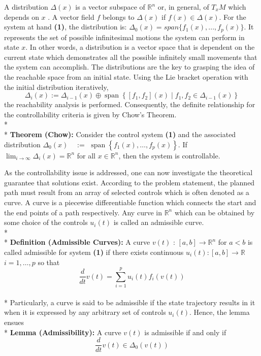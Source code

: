 \documentclass[letterpaper, 10 pt, conference]{ieeeconf}
\begin{document}
A distribution $\Delta(x)$ is a vector subspace of $\mathbb{R}^n$ or, in general, of $T_xM$ which depends on $x$ \cite{PAPER1}. A vector field $f$ belongs to $\Delta(x)$ if $f(x) \in \Delta(x)$. For the system at hand \textbf{(1)}, the distribution is: $\Delta_0(x) = span\{f_1(x),...,f_p(x)\}$. It represents the set of possible infinitesimal motions the system can perform in state $x$. In other words, a distribution is a vector space that is dependent on the current state which demonstrates all the possible infinitely small movements that the system can accomplish. The distributions are the key to grasping the idea of the reachable space from an initial state. Using the Lie bracket operation with the initial distribution iteratively,
\begin{equation}
\Delta_{i}(x):=\Delta_{i-1}(x) \oplus \operatorname{span}\left\{\left[f_{1}, f_{2}\right](x) \mid f_{1}, f_{2} \in \Delta_{i-1}(x)\right\} 
\end{equation}
the reachability analysis is performed. Consequently, the definite relationship for the controllability criteria is given by Chow’s Theorem.
\\*
\\*
\textbf{Theorem (Chow):} Consider the control system \textbf{(1)} and the associated distribution $\Delta_{0}(x) \quad:=$ $\operatorname{span}\left\{f_{1}(x), \ldots, f_{p}(x)\right\} .$ If $\lim _{i \rightarrow \infty} \Delta_{i}(x)=\mathbb{R}^n$ for all $x \in \mathbb{R}^n$, then the system is controllable.

As the controllability issue is addressed, one can now investigate the theoretical guarantee that solutions exist. According to the problem statement, the planned path must result from an array of selected controls which is often denoted as a curve. A curve is a piecewise differentiable function which connects the start and the end points of a path respectively. Any curve in $\mathbb{R}^n$ which can be obtained by some choice of the controls $u_i(t)$ is called an admissible curve. 
\\*
\\*
\textbf{Definition (Admissible Curves):} A curve $v(t)$ : $[a, b] \rightarrow \mathbb{R}^n$ for $a<b$ is called admissible for system \textbf{(1)} if there exists continuous $u_{i}(t):[a, b] \rightarrow \mathbb{R}$ $i=1, \ldots, p$ so that
\begin{equation}
\frac{d}{d t} v(t)=\sum_{i=1}^{p} u_{i}(t) f_{i}(v(t))
\end{equation}
\\*
Particularly, a curve is said to be admissible if the state trajectory results in it when it is expressed by any arbitrary set of controls $u_i(t)$. Hence, the lemma ensues
\\*
\textbf{Lemma (Admissibility):} A curve $v(t)$ is admissible if and only if 
\begin{equation}
\frac{d}{d t} v(t) \in \Delta_{0}(v(t))
\end{equation}
\end{document}
